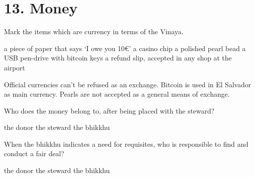 \chapter{13. Money}
\renewcommand*{\theChapterTitle}{13. Money}

\begin{exam}{\autoExamName}

  \begin{problem}

    Mark the items which are currency in terms of the Vinaya.

    \bigskip

    \begin{manswers}{1}
      \bChoices
       a piece of paper that says `I owe you 10€'\eAns
       a casino chip\eAns
       a polished pearl bead\eAns
       a USB pen-drive with bitcoin keys\eAns
       a refund slip, accepted in any shop at the airport\eAns
      \eChoices
    \end{manswers}

    \begin{solution}
      Official currencies can't be refused as an exchange. Bitcoin is used in El
      Salvador as main currency. Pearls are not accepted as a general means of
      exchange.
    \end{solution}
    
  \end{problem}

  \problemDivide

  \begin{problem*}

    \begin{parts}

    \item Who does the money belong to, after being placed with the steward?

      \bigskip

      \begin{answers}{3}
        \bChoices
         the donor\eAns
         the steward\eAns
         the bhikkhu\eAns
        \eChoices
      \end{answers}

      \bigskip

    \item When the bhikkhu indicates a need for requisites, who is responsible to find and conduct a fair deal?

      \bigskip

      \begin{answers}{3}
        \bChoices
         the donor\eAns
         the steward\eAns
         the bhikkhu\eAns
        \eChoices
      \end{answers}


\end{parts}
\end{problem*}
\end{exam}

